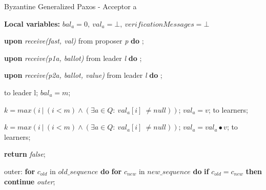 \begin{algorithm}
	\caption{Byzantine Generalized Paxos - Acceptor a}
	\textbf{Local variables: } $bal_a = 0,\ val_a = \bot,\ verificationMessages = \bot$ 
	\begin{algorithmic}[1]
		
		\State \textbf{upon} \textit{receive(fast, val)} from proposer \textit{p} \textbf{do}
		\State \hspace{\algorithmicindent} ;
		
		\State
		\State \textbf{upon} \textit{receive(p1a, ballot)} from leader \textit{l} \textbf{do}
		\State \hspace{\algorithmicindent} ;
		
		\State
		\State \textbf{upon} \textit{receive(p2a, ballot, value)} from leader \textit{l} \textbf{do}
		\State \hspace{\algorithmicindent} ; 
		
		\State
		\State {} to leader l;
		\State $bal_a = m$;
		\EndIf
		\EndFunction
		
		\State
		\State $k = max(i\ |\ (i < m) \wedge (\exists a \in Q :\ val_a[i]\ \neq null))$;
		\State $val_a = v$;
		\State {} to learners;
		\EndIf
		\EndFunction
		
		\State
		\State $k = max(i\ |\ (i < m) \wedge (\exists a \in Q :\ val_a[i]\ \neq null))$;
		\State $val_a = val_a \bullet v$;
		\State {} to learners;
		\EndIf
		\EndFunction
		
		\State
				\State \textbf{return} \textit{false};
			\EndIf
			
			\State
			\item[] outer:	
			\State \textbf{for} $c_{old}$ in $old\_sequence$ \textbf{do}
				\State \hspace{\algorithmicindent} \textbf{for} $c_{new}$ in $new\_sequence$ \textbf{do}
					\State\hspace{\algorithmicindent}\hspace{\algorithmicindent} \textbf{if} $c_{old} = c_{new}$ \textbf{then}
						\State \hspace{\algorithmicindent}\hspace{\algorithmicindent}\hspace{\algorithmicindent} \textbf{continue} \textit{outer};
					

\end{algorithmic}
\end{algorithm}
